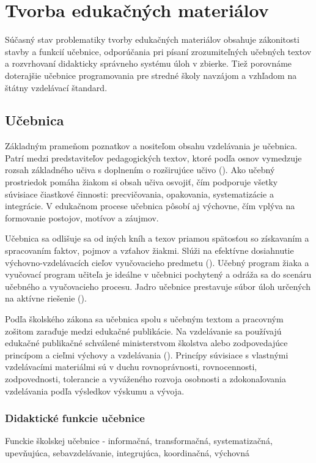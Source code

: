 \chapter{Tvorba edukačných materiálov} 
Súčasný stav problematiky tvorby edukačných materiálov obsahuje zákonitosti stavby a funkcií učebnice, odporúčania pri písaní zrozumiteľných učebných textov a rozvrhovaní didakticky správneho systému úloh v zbierke. Tiež porovnáme doterajšie učebnice programovania pre stredné školy navzájom a vzhľadom na štátny vzdelávací štandard. 

\section{Učebnica}
Základným prameňom poznatkov a nositeľom obsahu vzdelávania je učebnica. Patrí medzi predstaviteľov pedagogických textov, ktoré podľa osnov vymedzuje rozsah základného učiva s doplnením o rozširujúce učivo (\cite{zujev_ako_1986}). Ako učebný prostriedok pomáha žiakom si obsah učiva osvojiť, čím podporuje všetky súvisiace čiastkové činnosti: precvičovania, opakovania, systematizácie a integrácie. V edukačnom procese učebnica pôsobí aj výchovne, čím vplýva na formovanie postojov, motívov a záujmov. 

Učebnica sa odlišuje sa od iných kníh a texov priamou spätosťou so získavaním a spracovaním faktov, pojmov a vzťahov žiakmi. Slúži na efektívne dosiahnutie výchovno-vzdelávacích cieľov vyučovacieho predmetu (\cite{gavora_ziak_1992}). Učebný program žiaka a vyučovací program učiteľa je ideálne v učebnici pochytený a odráža sa do scenáru učebného a vyučovacieho procesu. Jadro učebnice prestavuje súbor úloh určených na aktívne riešenie (\cite{pavlovkin_ziak_1989}).

Podľa školského zákona sa učebnica spolu s učebným textom a pracovným zošitom zaraďuje medzi edukačné publikácie. Na vzdelávanie sa používajú edukačné publikačné schválené ministerstvom školstva alebo zodpovedajúce princípom a cieľmi výchovy a vzdelávania (\cite{skolsky_zakon}). Princípy súvisiace s vlastnými vzdelávacími materiálmi sú v duchu rovnoprávnosti, rovnocennosti, zodpovednosti, tolerancie a vyváženého rozvoja osobnosti a zdokonaľovania vzdelávania podľa výsledkov výskumu a vývoja.


\subsection{Didaktické funkcie učebnice}
Funckie školskej učebnice - informačná, transformačná, systematizačná, upevňujúca, sebavzdelávanie, integrujúca, koordinačná, výchovná \cite{zujev_ako_1986}

